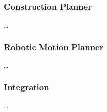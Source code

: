 \subsubsection{Construction Planner}

\ldots

\subsubsection{Robotic Motion Planner}

\ldots

\subsubsection{Integration}

\ldots

\newpage


